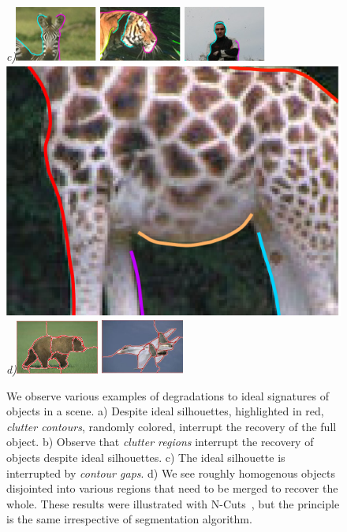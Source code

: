 \begin{figure}[ht]
{\footnotesize\textit{c)}}\includegraphics[width=0.241\textwidth]{figs/zebra_miss.pdf}
\includegraphics[width=0.241\textwidth]{figs/tiger_miss.pdf}
\includegraphics[width=0.241\textwidth]{figs/person_miss.pdf}
\includegraphics[height=0.16\textwidth]{figs/giraffe_miss.pdf}
{\footnotesize\textit{d)}}\includegraphics[width=0.243\textwidth]{figs/bear_segment.jpeg}
\includegraphics[width=0.243\textwidth]{figs/plane_segment.png}
\caption{We observe various examples of degradations to ideal signatures of objects in a scene. a) Despite ideal silhouettes, highlighted in red, \emph{clutter contours}, randomly colored, interrupt the recovery of the full object. b) Observe that \emph{clutter regions} interrupt the recovery of objects despite ideal silhouettes. c) The ideal silhouette is interrupted by \emph{contour gaps}. d) We see roughly homogenous objects disjointed into various regions that need to be merged to recover the whole. These results were illustrated with N-Cuts~\cite{Shi:Malik:PAMI00}, but the principle is the same irrespective of segmentation algorithm. } 
\label{fig:trans_examples}
\end{figure}

